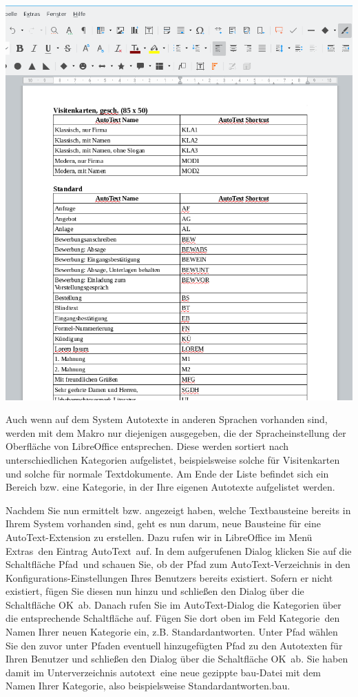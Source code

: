 \documentclass[a4paper,10pt,pagesize,titlepage]{scrbook}
\begin{document}
\begin{center}
	\captionsetup{type=figure}
	\includegraphics[width=0.9\linewidth]{pics/available_autotext}
	\label{fig:available_autotext}
\end{center}

Auch wenn auf dem System Autotexte in anderen Sprachen vorhanden sind, werden mit dem Makro nur diejenigen ausgegeben, die der Spracheinstellung der Oberfläche von LibreOffice entsprechen. Diese werden sortiert nach unterschiedlichen Kategorien aufgelistet, beispielsweise solche für Visitenkarten und solche für normale Textdokumente. Am Ende der Liste befindet sich ein Bereich bzw. eine Kategorie, in der Ihre eigenen Autotexte aufgelistet werden.

Nachdem Sie nun ermittelt bzw. angezeigt haben, welche Textbausteine bereits in Ihrem System vorhanden sind, geht es nun darum, neue Bausteine für eine AutoText-Extension zu erstellen. Dazu rufen wir in LibreOffice im Menü \glqq Extras\grqq~den Eintrag \glqq AutoText\grqq~auf. In dem aufgerufenen Dialog klicken Sie auf die Schaltfläche \glqq Pfad\grqq~und schauen Sie, ob der Pfad zum AutoText-Verzeichnis in den Konfigurations-Einstellungen Ihres Benutzers bereits existiert. Sofern er nicht existiert, fügen Sie diesen nun hinzu und schließen den Dialog über die Schaltfläche \glqq OK\grqq~ab. Danach rufen Sie im AutoText-Dialog die Kategorien über die entsprechende Schaltfläche auf. Fügen Sie dort oben im Feld \glqq Kategorie\grqq~den Namen Ihrer neuen Kategorie ein, z.B. \glqq Standardantworten\grqq. Unter Pfad wählen Sie den zuvor unter Pfaden eventuell hinzugefügten Pfad zu den Autotexten für Ihren Benutzer und schließen den Dialog über die Schaltfläche \glqq OK\grqq~ab. Sie haben damit im Unterverzeichnis \glqq autotext\grqq~eine neue gezippte bau-Datei mit dem Namen Ihrer Kategorie, also beispielsweise \glqq Standardantworten.bau\grqq.
\end{document}
